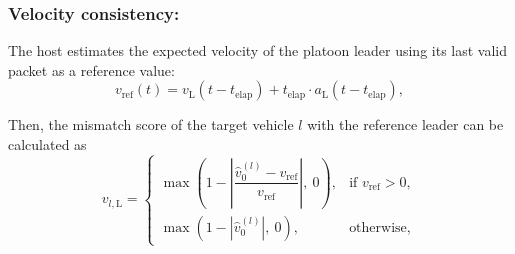 

\subsubsection{Velocity consistency:}
The host estimates the expected velocity of the platoon leader using its last valid packet as a reference value:
\begin{equation}
    v_{\text{ref}}(t) = {v}_{\text{L}}(t-t_{\text{elap}}) + t_{\text{elap}} \cdot {a}_{\text{L}}(t-t_{\text{elap}}), 
\end{equation}

Then, the mismatch score of the target vehicle $l$ with the reference leader can be calculated as
\begin{equation}
    v_{l,\text{L}} = 
        \begin{cases} 
            \max\left(1 - \left|\dfrac{\hat{v}_{0}^{(l)} - v_{\text{ref}}}{v_{\text{ref}}}\right|,\  0\right), & \text{if } v_\text{ref} > 0, \\
            \max\left(1 - | \hat{v}_{0}^{(l)}|,\  0\right), & \text{otherwise},
        \end{cases}
\end{equation}

